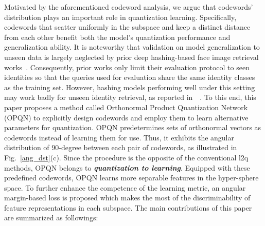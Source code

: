 \documentclass{elsarticle}
\begin{document}
Motivated by the aforementioned codeword analysis, we argue that codewords' distribution plays an important role in quantization learning. Specifically, codewords that scatter uniformly in the subspace and keep a distinct distance from each other benefit both the model's quantization performance and generalization ability. It is noteworthy that validation on model generalization to unseen data is largely neglected by prior deep hashing-based face image retrieval works~\cite{lin2017discriminative,zhang2021deep}. Consequently, prior works only limit their evaluation protocol to seen identities so that the queries used for evaluation share the same identity classes as the training set. However, hashing models performing well under this setting may work badly for unseen identity retrieval, as reported in~~\cite{sablayrolles2017should}. To this end, this paper proposes a method called Orthonormal Product Quantization Network (OPQN) to explicitly design codewords and employ them to learn alternative parameters for quantization. OPQN predetermines sets of orthonormal vectors as codewords instead of learning them for use. Thus, it exhibits the angular distribution of 90-degree between each pair of codewords, as illustrated in Fig.~\ref{ang_dst}(c). Since the procedure is the opposite of the conventional l2q methods, OPQN belongs to \textbf{\textit{quantization to learning}}. %
Equipped with these predefined codewords, OPQN learns more separable features in the hyper-sphere space. To further enhance the competence of the learning metric, an angular margin-based loss is proposed which makes the most of the discriminability of feature representations in each subspace. The main contributions of this paper are summarized as followings:
\end{document}
